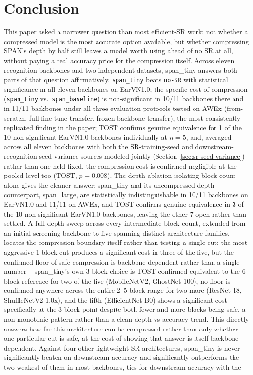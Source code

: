 \documentclass[11pt]{article}
\begin{document}
\section{Conclusion}
\label{sec:conclusion}

This paper asked a narrower question than most efficient-SR work: not whether a compressed model is the most accurate option available, but whether compressing SPAN's depth by half still leaves a model worth using ahead of no SR at all, without paying a real accuracy price for the compression itself. Across eleven recognition backbones and two independent datasets, span\_tiny answers both parts of that question affirmatively. \texttt{span\_tiny} beats \texttt{no-SR} with statistical significance in all eleven backbones on EarVN1.0; the specific cost of compression (\texttt{span\_tiny} vs.\ \texttt{span\_baseline}) is non-significant in 10/11 backbones there and in 11/11 backbones under all three evaluation protocols tested on AWEx (from-scratch, full-fine-tune transfer, frozen-backbone transfer), the most consistently replicated finding in the paper; TOST confirms genuine equivalence for 1 of the 10 non-significant EarVN1.0 backbones individually at $n=5$, and, averaged across all eleven backbones with both the SR-training-seed and downstream-recognition-seed variance sources modeled jointly (Section~\ref{sec:sr-seed-variance}) rather than one held fixed, the compression cost is confirmed negligible at the pooled level too (TOST, $p=0.008$). The depth ablation isolating block count alone gives the cleaner answer: span\_tiny and its uncompressed-depth counterpart, span\_large, are statistically indistinguishable in 10/11 backbones on EarVN1.0 and 11/11 on AWEx, and TOST confirms genuine equivalence in 3 of the 10 non-significant EarVN1.0 backbones, leaving the other 7 open rather than settled. A full depth sweep across every intermediate block count, extended from an initial screening backbone to five spanning distinct architecture families, locates the compression boundary itself rather than testing a single cut: the most aggressive 1-block cut produces a significant cost in three of the five, but the confirmed floor of safe compression is backbone-dependent rather than a single number -- span\_tiny's own 3-block choice is TOST-confirmed equivalent to the 6-block reference for two of the five (MobileNetV2, GhostNet-100), no floor is confirmed anywhere across the entire 2--5 block range for two more (ResNet-18, ShuffleNetV2-1.0x), and the fifth (EfficientNet-B0) shows a significant cost specifically at the 3-block point despite both fewer and more blocks being safe, a non-monotonic pattern rather than a clean depth-vs-accuracy trend. This directly answers how far this architecture can be compressed rather than only whether one particular cut is safe, at the cost of showing that answer is itself backbone-dependent. Against four other lightweight SR architectures, span\_tiny is never significantly beaten on downstream accuracy and significantly outperforms the two weakest of them in most backbones, ties for downstream accuracy with the 
\end{document}
